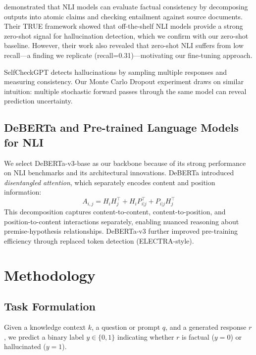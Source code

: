 \documentclass[11pt]{article}
\begin{document}
\citet{honovich2022true} demonstrated that NLI models can evaluate factual consistency by decomposing outputs into atomic claims and checking entailment against source documents. Their TRUE framework showed that off-the-shelf NLI models provide a strong zero-shot signal for hallucination detection, which we confirm with our zero-shot baseline. However, their work also revealed that zero-shot NLI suffers from low recall---a finding we replicate (recall=0.31)---motivating our fine-tuning approach.

SelfCheckGPT \cite{manakul2023selfcheckgpt} detects hallucinations by sampling multiple responses and measuring consistency. Our Monte Carlo Dropout experiment draws on similar intuition: multiple stochastic forward passes through the same model can reveal prediction uncertainty.

\subsection{DeBERTa and Pre-trained Language Models for NLI}

We select DeBERTa-v3-base \cite{he2021deberta,he2023debertav3} as our backbone because of its strong performance on NLI benchmarks and its architectural innovations. DeBERTa introduced \textit{disentangled attention}, which separately encodes content and position information:
\[
A_{i,j} = H_i H_j^\top + H_i P_{i|j}^\top + P_{i|j} H_j^\top
\]
This decomposition captures content-to-content, content-to-position, and position-to-content interactions separately, enabling nuanced reasoning about premise-hypothesis relationships. DeBERTa-v3 further improved pre-training efficiency through replaced token detection (ELECTRA-style).

\section{Methodology}

\subsection{Task Formulation}

Given a knowledge context $k$, a question or prompt $q$, and a generated response $r$, we predict a binary label $y \in \{0, 1\}$ indicating whether $r$ is factual ($y=0$) or hallucinated ($y=1$).
\end{document}

